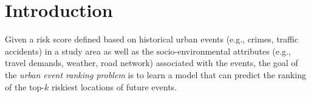 \documentclass{article}
\begin{document}
\begin{abstract}


\end{abstract}



\section{Introduction}

Given a risk score defined based on historical urban events (e.g., crimes, traffic accidents) in a study area as well as the socio-environmental attributes (e.g., travel demands, weather, road network) associated with the events, the goal of the \emph{urban event ranking problem} is to learn a model that can predict the ranking of the top-$k$ riskiest locations of future events. 
\end{document}
